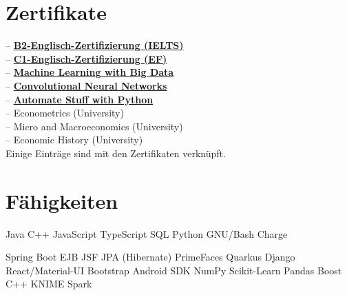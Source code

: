 \documentclass[]{CV-JuanCamiloFlorez}
\begin{document}
\begin{minipage}[t]{0.33\textwidth}
\section{Zertifikate}
-- \textbf{\href{https://jcamilo.co/IELTS-2022.pdf}{B2-Englisch-Zertifizierung (IELTS)}} \\
-- \textbf{\href{https://www.efset.org/cert/j8ebfw}{C1-Englisch-Zertifizierung (EF)}} \\
-- \textbf{\href{https://www.coursera.org/account/accomplishments/certificate/8MS64GGYWDT5?utm_medium=certificate&utm_source=link&utm_campaign=copybutton_certificate}{Machine Learning with Big Data}} \\
-- \textbf{\href{https://www.coursera.org/account/accomplishments/certificate/KFN2XJC2KP92?utm_medium=certificate&utm_source=link&utm_campaign=copybutton_certificate}{Convolutional Neural Networks}} \\
-- \textbf{\href{https://www.udemy.com/certificate/UC-ZHLLMBQA}{Automate Stuff with Python}} \\
-- Econometrics (University) \\
-- Micro and Macroeconomics (University) \\
-- Economic History (University) \\
\smallskip
\scriptsize{Einige Einträge sind mit den Zertifikaten verknüpft.}
\sectionsep


\section{Fähigkeiten}
    \textbullet{} Java
    \textbullet{} C++
    \textbullet{} JavaScript
    \textbullet{} TypeScript
    \textbullet{} SQL
    \textbullet{} Python
    \textbullet{} GNU/Bash
    \textbullet{} Charge

    \textbullet{} Spring Boot
    \textbullet{} EJB JSF JPA (Hibernate) PrimeFaces
    \textbullet{} Quarkus
    \textbullet{} Django
    \textbullet{} React/Material-UI
    \textbullet{} Bootstrap
    \textbullet{} Android SDK
    \textbullet{} NumPy
    \textbullet{} Scikit-Learn
    \textbullet{} Pandas
    \textbullet{} Boost C++
    \textbullet{} KNIME
    \textbullet{} Spark


\end{minipage}
\end{document}
